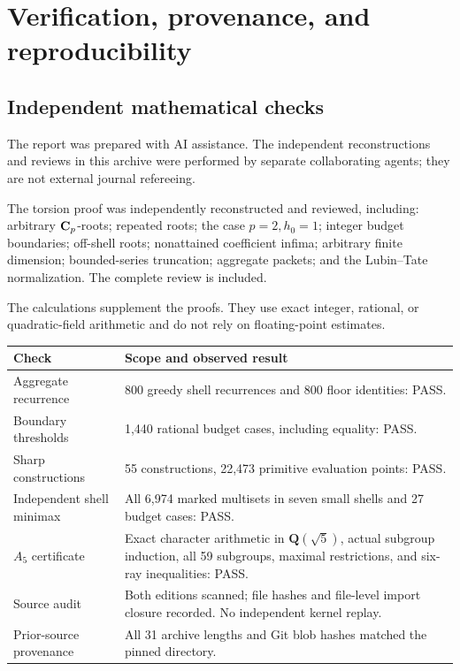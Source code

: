 \section{Verification, provenance, and reproducibility}
\label{sec:verification}

\subsection{Independent mathematical checks}
The report was prepared with AI assistance. The independent reconstructions and reviews in this archive were performed by separate collaborating agents; they are not external journal refereeing.

The torsion proof was independently reconstructed and reviewed, including:
arbitrary \(\mathbf C_p\)-roots; repeated roots; the case \(p=2,h_0=1\); integer budget boundaries; off-shell roots; nonattained coefficient infima; arbitrary finite dimension; bounded-series truncation; aggregate packets; and the Lubin--Tate normalization. The complete review is included.

The calculations supplement the proofs. They use exact integer, rational, or quadratic-field arithmetic and do not rely on floating-point estimates.

\begin{center}
\small
\begin{tabularx}{\textwidth}{@{}p{}X@{}}
\toprule
Check & Scope and observed result\\
\midrule
Aggregate recurrence & 800 greedy shell recurrences and 800 floor identities: PASS.\\
Boundary thresholds & 1,440 rational budget cases, including equality: PASS.\\
Sharp constructions & 55 constructions, 22,473 primitive evaluation points: PASS.\\
Independent shell minimax & All 6,974 marked multisets in seven small shells and 27 budget cases: PASS.\\
\(A_5\) certificate & Exact character arithmetic in \(\mathbf Q(\sqrt5)\), actual subgroup induction, all 59 subgroups, maximal restrictions, and six-ray inequalities: PASS.\\
Source audit & Both editions scanned; file hashes and file-level import closure recorded. No independent kernel replay.\\
Prior-source provenance & All 31 archive lengths and Git blob hashes matched the pinned directory.\\
\bottomrule
\end{tabularx}
\end{center}

